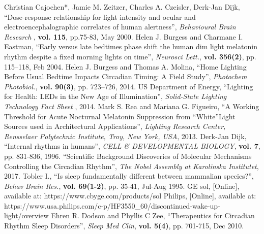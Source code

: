 \begin{thebibliography}{5}
 Christian  Cajochen*,  Jamie  M.  Zeitzer,  Charles  A.  Czeisler,  Derk-Jan  Dijk, ``Dose-response  relationship  for  light  intensity  and  ocular  and electroencephalographic  correlates  of  human  alertness'', \emph{Behavioural Brain Research }, {\bf vol. 115}, pp.75-83, May 2000.
 Helen J. Burgess and Charmane I. Eastman, ``Early versus late bedtimes phase shift the human dim light melatonin rhythm despite a fixed morning lights on time'', \emph{Neurosci Lett.}, {\bf vol. 356(2)}, pp. 115–118, Feb 2004.
 Helen J. Burgess and Thomas A. Molina, ``Home Lighting Before Usual Bedtime Impacts Circadian Timing: A Field Study'', \emph{Photochem Photobiol.}, {\bf vol. 90(3)}, pp. 723–726, 2014.
 US Department of Energy, ``Lighting for Health: LEDs in the New Age of Illumination'', \emph{Solid-State Lighting Technology Fact Sheet }, 2014.
 Mark S. Rea and Mariana G. Figueiro, ``A Working Threshold for Acute Nocturnal Melatonin Suppression from “White”Light Sources used in Architectural Applications'', \emph{Lighting Research Center, Rensselaer Polytechnic Institute, Troy, New York, USA}, 2013.
 Derk-Jan Dijk, ``Internal rhythms in humans'', \emph{CELL \& DEVELOPMENTAL BIOLOGY}, {\bf vol. 7}, pp. 831-836, 1996.
 ``Scientific Background Discoveries of Molecular Mechanisms Controlling the Circadian Rhythm'', \emph{The Nobel Assembly at Karolinska Institutet}, 2017.
 Tobler I., ``Is sleep fundamentally different between mammalian species?'', \emph{Behav Brain Res.}, {\bf vol. 69(1-2)}, pp. 35-41, Jul-Aug 1995.
 GE sol, [Online], available at: https://www.cbyge.com/products/sol
 Philips, [Online], available at: https://www.usa.philips.com/c-p/HF3550\_60/discontinued-wake-up-light/overview
 Ehren R. Dodson and Phyllis C Zee, ``Therapeutics for Circadian Rhythm Sleep Disorders'', \emph{Sleep Med Clin}, \textbf{vol. 5(4)}, pp. 701-715, Dec 2010.


\end{thebibliography}
